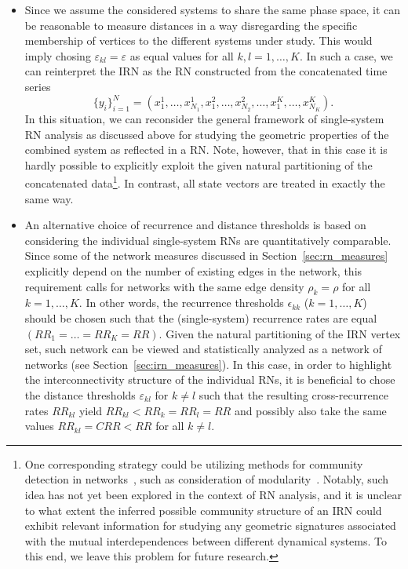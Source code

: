 \begin{itemize}

\item Since we assume the considered systems to share the same phase space, it can be reasonable to measure distances in a way disregarding the specific membership of vertices to the different systems under study. This would imply chosing $\varepsilon_{kl}=\varepsilon$ as equal values for all $k,l=1,\dots,K$. In such a case, we can reinterpret the IRN as the RN constructed from the concatenated time series 
$$\{y_i\}_{i=1}^N=(x_1^1,\dots,x_{N_1}^1,x_1^2,\dots,x_{N_2}^2,\dots,x_1^K,\dots,x_{N_K}^K).$$ 
In this situation, we can reconsider the general framework of single-system RN analysis as discussed above for studying the geometric properties of the combined system as reflected in a RN. Note, however, that in this case it is hardly possible to explicitly exploit the given natural partitioning of the concatenated data\footnote{One corresponding strategy could be utilizing methods for community detection in networks~\cite{Fortunato2010}, such as consideration of modularity~\cite{Newman2004}. Notably, such idea has not yet been explored in the context of RN analysis, and it is unclear to what extent the inferred possible community structure of an IRN could exhibit relevant information for studying any geometric signatures associated with the mutual interdependences between different dynamical systems. To this end, we leave this problem for future research.}. In contrast, all state vectors are treated in exactly the same way.

\item An alternative choice of recurrence and distance thresholds is based on considering the individual single-system RNs are quantitatively comparable. Since some of the network measures discussed in Section~\ref{sec:rn_measures} explicitly depend on the number of existing edges in the network, this requirement calls for networks with the same edge density $\rho_k=\rho$ for all $k=1,\dots,K$. In other words, the recurrence thresholds $\epsilon_{kk}$ ($k=1,\dots,K$) should be chosen such that the (single-system) recurrence rates are equal $(RR_1=\dots=RR_K=RR)$. Given the natural partitioning of the IRN vertex set, such network can be viewed and statistically analyzed as a network of networks (see Section~\ref{sec:irn_measures}). In this case, in order to highlight the interconnectivity structure of the individual RNs, it is beneficial to chose the distance thresholds $\varepsilon_{kl}$ for $k\neq l$ such that the resulting cross-recurrence rates $RR_{kl}$ yield $RR_{kl}<RR_k=RR_l=RR$ and possibly also take the same values $RR_{kl}=CRR<RR$ for all $k\neq l$.

\end{itemize}

